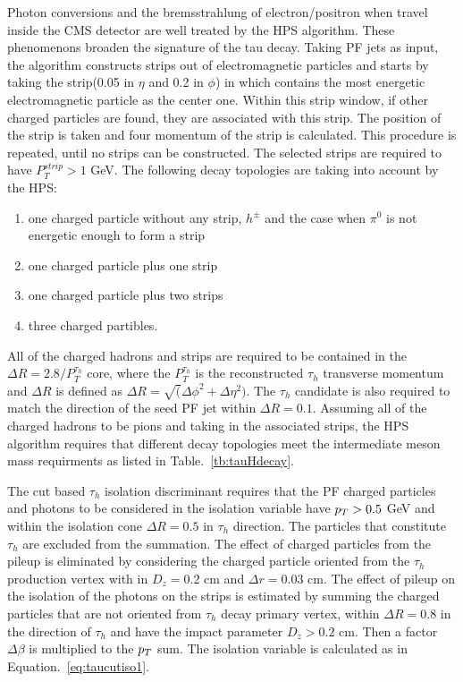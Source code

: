Photon conversions and the bremsstrahlung of electron/positron when travel inside the CMS detector are well treated by the HPS algorithm. These phenomenons broaden the signature of the tau decay. Taking PF jets as input, the algorithm constructs strips out of electromagnetic particles and starts by taking the strip(0.05 in $\eta$ and 0.2 in $\phi$) in which contains the most energetic electromagnetic particle as the center one. Within this strip window, if other charged particles are found, they are associated with this strip. The position of the strip is taken and four momentum of the strip is calculated. This procedure is repeated, until no strips can be constructed. The selected strips are required to have $P_{T}^{strip}>1$ GeV. The following decay topologies are taking into account by the HPS:
\begin{enumerate}[$\bullet$]
\item one charged particle without any strip, $h^{\pm}$ and the case when $\pi^{0}$ is not energetic enough to form a strip
\item one charged particle plus one strip
\item one charged particle plus two strips
\item three charged partibles. 
\end{enumerate} 

All of the charged hadrons and strips are required to be contained in the $\Delta R=2.8/P_{T}^{\tau_{h}}$ core, where the $P_{T}^{\tau_{h}}$ is the reconstructed $\tau_{h}$ transverse momentum and $\Delta R$ is defined as $\Delta R=\sqrt(\Delta \phi^{2}+\Delta \eta^{2})$. The $\tau_{h}$ candidate is also required to match the direction of the seed PF jet within $\Delta R=0.1$. Assuming all of the charged hadrons to be pions and taking in the associated strips, the HPS algorithm requires that different decay topologies meet the intermediate meson mass requirments as listed in Table.~\ref{tb:tauHdecay}. 

The cut based $\tau_{h}$ isolation discriminant requires that the PF charged particles and photons to be considered in the isolation variable have $p_{T}>0.5$ GeV and within the isolation cone  $\Delta R=0.5$ in $\tau_{h}$ direction. The particles that  constitute $\tau_{h}$ are excluded from the summation. The effect of charged particles from the pileup is eliminated by considering the charged particle oriented from the $\tau_{h}$ production vertex with in $D_{z}=0.2$ cm and $\Delta r=0.03$ cm. The effect of pileup on the isolation of the photons on the strips is estimated by summing the charged particles that are not oriented from $\tau_{h}$ decay primary vertex, within $\Delta R=0.8$ in the direction of $\tau_{h}$ and have the impact parameter $D_{z}>0.2$ cm. Then a factor $\Delta \beta$ is multiplied to the $p_{T}$ sum. The isolation variable is calculated as in Equation.~\ref{eq:taucutiso1}.

